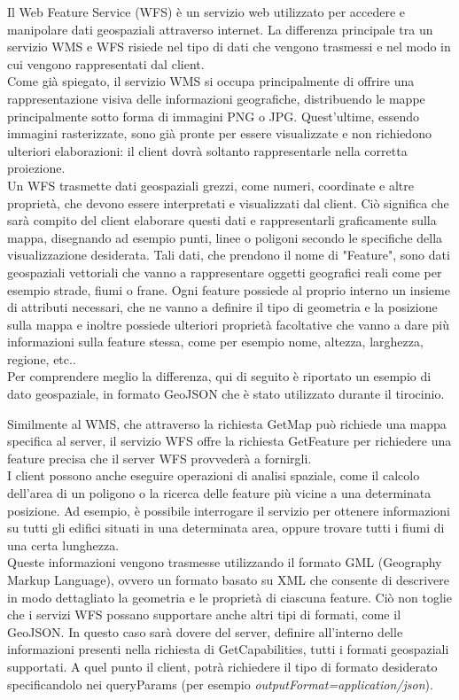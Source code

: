 Il Web Feature Service (WFS) è un servizio web utilizzato per accedere e manipolare dati geospaziali attraverso internet. La differenza principale tra un servizio WMS e WFS risiede nel tipo di dati che vengono trasmessi e nel modo in cui vengono rappresentati dal client.
\\Come già spiegato, il servizio WMS si occupa principalmente di offrire una rappresentazione visiva delle informazioni geografiche, distribuendo le mappe principalmente sotto forma di immagini PNG o JPG. Quest'ultime, essendo immagini rasterizzate, sono già pronte per essere visualizzate e non richiedono ulteriori elaborazioni: il client dovrà soltanto rappresentarle nella corretta proiezione.
\\Un WFS trasmette dati geospaziali grezzi, come numeri, coordinate e altre proprietà, che devono essere interpretati e visualizzati dal client. Ciò significa che sarà compito del client elaborare questi dati e rappresentarli graficamente sulla mappa, disegnando ad esempio punti, linee o poligoni secondo le specifiche della visualizzazione desiderata. Tali dati, che prendono il nome di "Feature", sono dati geospaziali vettoriali che vanno a rappresentare oggetti geografici reali come per esempio strade, fiumi o frane. Ogni feature possiede al proprio interno un insieme di attributi necessari, che ne vanno a definire il tipo di geometria e la posizione sulla mappa e inoltre possiede ulteriori proprietà facoltative che vanno a dare più informazioni sulla feature stessa, come per esempio nome, altezza, larghezza, regione, etc..
\\Per comprendere meglio la differenza, qui di seguito è riportato un esempio di dato geospaziale, in formato GeoJSON che è stato utilizzato durante il tirocinio.

Similmente al WMS, che attraverso la richiesta GetMap può richiede una mappa specifica al server, il servizio WFS offre la richiesta GetFeature per richiedere una feature precisa che il server WFS provvederà a fornirgli.
\\I client possono anche eseguire operazioni di analisi spaziale, come il calcolo dell'area di un poligono o la ricerca delle feature più vicine a una determinata posizione.
Ad esempio, è possibile interrogare il servizio per ottenere informazioni su tutti gli edifici situati in una determinata area, oppure trovare tutti i fiumi di una certa lunghezza.
\\Queste informazioni vengono trasmesse utilizzando il formato GML (Geography Markup Language), ovvero un formato basato su XML che consente di descrivere in modo dettagliato la geometria e le proprietà di ciascuna feature. Ciò non toglie che i servizi WFS possano supportare anche altri tipi di formati, come il GeoJSON. In questo caso sarà dovere del server, definire all'interno delle informazioni presenti nella richiesta di GetCapabilities, tutti i formati geospaziali supportati. A quel punto il client, potrà richiedere il tipo di formato desiderato specificandolo nei queryParams (per esempio \textit{outputFormat=application/json}).

